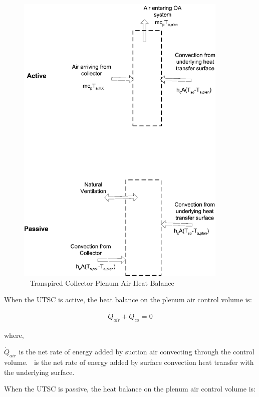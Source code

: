 \begin{figure}[hbtp] %
\centering
\includegraphics[width=0.9\textwidth, height=0.9\textheight, keepaspectratio=true]{media/image6664.png}
\caption{  Transpired Collector Plenum Air Heat Balance \protect \label{fig:transpired-collector-plenum-air-heat-balance}}
\end{figure}

When the UTSC is active, the heat balance on the plenum air control volume is:

\begin{equation}
{\dot Q_{air}} + {\dot Q_{co}}_{} = 0
\end{equation}

where,

\({\dot Q_{air}}\) is the net rate of energy added by suction air convecting through the control volume. \(_{ }\)~is the net rate of energy added by surface convection heat transfer with the underlying surface.

When the UTSC is passive, the heat balance on the plenum air control volume is:

